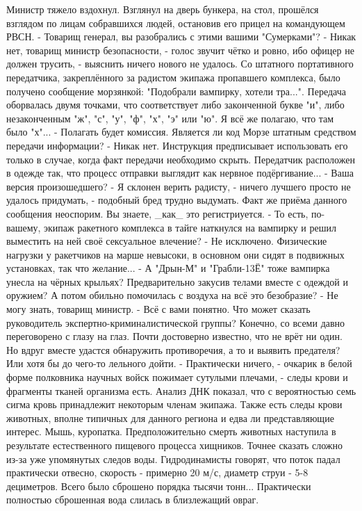 Министр тяжело вздохнул. Взглянул на дверь бункера, на стол, прошёлся взглядом по лицам собравшихся людей, остановив его прицел на командующем РВСН.
 - Товарищ генерал, вы разобрались с этими вашими "Сумерками"?
 - Никак нет, товарищ министр безопасности, - голос звучит чётко и ровно, ибо офицер не должен трусить, - выяснить ничего нового не удалось. Со штатного портативного передатчика, закреплённого за радистом экипажа пропавшего комплекса, было получено сообщение морзянкой: "Подобрали вампирку, хотели тра...". Передача оборвалась двумя точками, что соответствует либо законченной букве "и", либо незаконченным "ж", "с", "у", "ф", "х", "э" или "ю". Я всё же полагаю, что там было "х"...
 - Полагать будет комиссия. Является ли код Морзе штатным средством передачи информации?
 - Никак нет. Инструкция предписывает использовать его только в случае, когда факт передачи необходимо скрыть. Передатчик расположен в одежде так, что процесс отправки выглядит как нервное подёргивание...
 - Ваша версия произошедшего?
 - Я склонен верить радисту, - ничего лучшего просто не удалось придумать, - подобный бред трудно выдумать.
 Факт же приёма данного сообщения неоспорим. Вы знаете, \_как\_ это регистриуется.
 - То есть, по-вашему, экипаж ракетного комплекса в тайге наткнулся на вампирку и решил выместить на ней своё сексуальное влечение?
 - Не исключено. Физические нагрузки у ракетчиков на марше невысоки, в основном они сидят в подвижных установках, так что желание...
 - А "Дрын-М" и "Грабли-13Ё" тоже вампирка унесла на чёрных крыльях? Предварительно закусив телами вместе с одеждой и оружием? А потом обильно помочилась с воздуха на всё это безобразие?
 - Не могу знать, товарищ министр.
 - Всё с вами понятно. Что может сказать руководитель экспертно-криминалистической группы?
Конечно, со всеми давно переговорено с глазу на глаз. Почти достоверно известно, что не врёт ни один. Но вдруг вместе удастся обнаружить противоречия, а то и выявить предателя? Или хотя бы до чего-то лельного дойти.
 - Практически ничего, - очкарик в белой форме полковника научных войск пожимает сутулыми плечами, - следы крови и фрагменты тканей организма есть. Анализ ДНК показал, что с вероятностью семь сигма кровь принадлежит некоторым членам экипажа. Также есть следы крови животных, вполне типичных для данного региона и едва ли представляющие интерес. Мышь, куропатка. Предположительно смерть животных наступила в результате естественного пищевого процесса хищников. Точнее сказать сложно из-за уже упомянутых следов воды. Гидродинамисты говорят, что поток падал практически отвесно, скорость - примерно 20 м/с, диаметр струи - 5-8 дециметров. Всего было сброшено порядка тысячи тонн... Практически полностью сброшенная вода слилась в близлежащий овраг.
